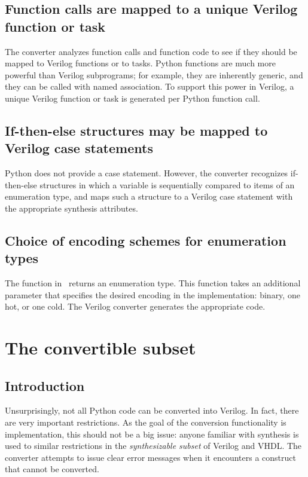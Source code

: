 \subsection{Function calls are mapped to a unique Verilog function or task\label{conv-features-func}}
The converter analyzes function calls and function code to see if they
should be mapped to Verilog functions or to tasks. Python functions
are much more powerful than Verilog subprograms; for example, they are
inherently generic, and they can be called with named association.  To
support this power in Verilog, a unique Verilog function or task is
generated per Python function call.

\subsection{If-then-else structures may be mapped to Verilog case statements\label{conv-features-if}}
Python does not provide a case statement. However, 
the converter recognizes if-then-else structures in which a variable is
sequentially compared to items of an enumeration type, and maps
such a structure to a Verilog case statement with the appropriate
synthesis attributes.

\subsection{Choice of encoding schemes for enumeration types\label{conv-features-enum}}
The  function in \myhdl\ returns an enumeration type. This
function takes an additional parameter  that specifies the
desired encoding in the implementation: binary, one hot, or one cold.
The Verilog converter generates the appropriate code.


\section{The convertible subset\label{conv-subset}}

\subsection{Introduction\label{conv-subset-intro}}

Unsurprisingly, not all Python code can be converted into Verilog. In
fact, there are very important restrictions.  As the goal of the
conversion functionality is implementation, this should not be a big
issue: anyone familiar with synthesis is used to similar restrictions
in the \emph{synthesizable subset} of Verilog and VHDL. The converter
attempts to issue clear error messages when it encounters a construct
that cannot be converted. 


